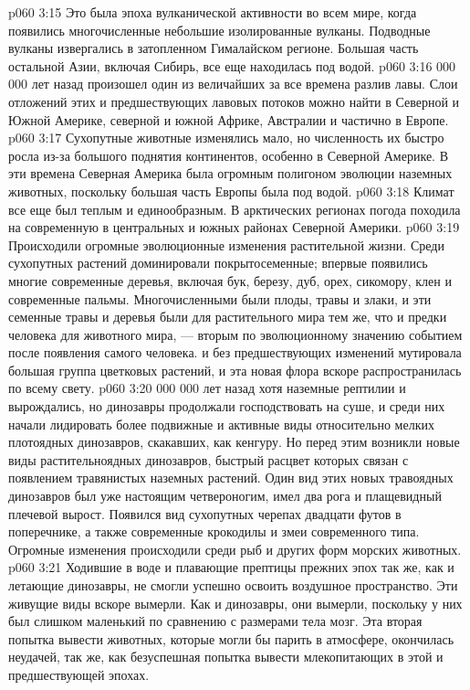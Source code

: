 \vs p060 3:15 Это была эпоха вулканической активности во всем мире, когда появились многочисленные небольшие изолированные вулканы. Подводные вулканы извергались в затопленном Гималайском регионе. Большая часть остальной Азии, включая Сибирь, все еще находилась под водой.
\vs p060 3:16  000 000 лет назад произошел один из величайших за все времена разлив лавы. Слои отложений этих и предшествующих лавовых потоков можно найти в Северной и Южной Америке, северной и южной Африке, Австралии и частично в Европе.
\vs p060 3:17 Сухопутные животные изменялись мало, но численность их быстро росла из\hyp{}за большого поднятия континентов, особенно в Северной Америке. В эти времена Северная Америка была огромным полигоном эволюции наземных животных, поскольку большая часть Европы была под водой.
\vs p060 3:18 Климат все еще был теплым и единообразным. В арктических регионах погода походила на современную в центральных и южных районах Северной Америки.
\vs p060 3:19 Происходили огромные эволюционные изменения растительной жизни. Среди сухопутных растений доминировали покрытосеменные; впервые появились многие современные деревья, включая бук, березу, дуб, орех, сикомору, клен и современные пальмы. Многочисленными были плоды, травы и злаки, и эти семенные травы и деревья были для растительного мира тем же, что и предки человека для животного мира, --- вторым по эволюционному значению событием после появления самого человека.  и без предшествующих изменений мутировала большая группа цветковых растений, и эта новая флора вскоре распространилась по всему свету.
\vs p060 3:20  000 000 лет назад хотя наземные рептилии и вырождались, но динозавры продолжали господствовать на суше, и среди них начали лидировать более подвижные и активные виды относительно мелких плотоядных динозавров, скакавших, как кенгуру. Но перед этим возникли новые виды растительноядных динозавров, быстрый расцвет которых связан с появлением травянистых наземных растений. Один вид этих новых травоядных динозавров был уже настоящим четвероногим, имел два рога и плащевидный плечевой вырост. Появился вид сухопутных черепах двадцати футов в поперечнике, а также современные крокодилы и змеи современного типа. Огромные изменения происходили среди рыб и других форм морских животных.
\vs p060 3:21 Ходившие в воде и плавающие прептицы прежних эпох так же, как и летающие динозавры, не смогли успешно освоить воздушное пространство. Эти живущие виды вскоре вымерли. Как и динозавры, они вымерли, поскольку у них был слишком маленький по сравнению с размерами тела мозг. Эта вторая попытка вывести животных, которые могли бы парить в атмосфере, окончилась неудачей, так же, как безуспешная попытка вывести млекопитающих в этой и предшествующей эпохах.
